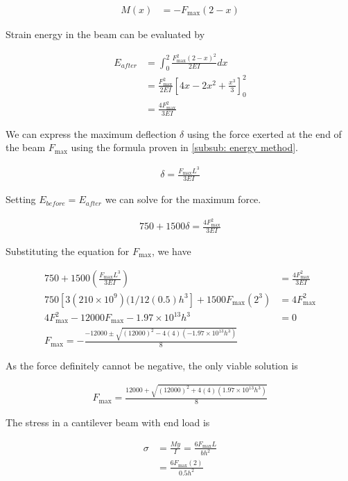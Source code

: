 \documentclass[
10pt,
a4paper,
openany,
svgnames,
]{book}
\begin{document}
\begin{evensolution}
  \begin{align*}
    M(x) &= -F_{\max}(2 - x)
  \end{align*}

  Strain energy in the beam can be evaluated by

  \begin{align*}
    E_{after} &= \int_0^2 \frac{F_{\max}^2(2-x)^2}{2EI} dx \\
              &= \frac{F_{\max}^2}{2EI} \left[ 4x - 2x^2 + \frac{x^3}{3} \right]_0^2 \\
              &=  \frac{4F_{\max}^2}{3EI}
  \end{align*}

  We can express the maximum deflection $\delta$ using the force exerted at the
  end of the beam $F_{\max}$ using the formula proven in \ref{subsub: energy
    method}.

  \begin{align*}
    \delta = \frac{F_{\max}L^3}{3EI}
  \end{align*}

  Setting $E_{before} = E_{after}$ we can solve for the maximum force.

  \begin{align*}
    750 + 1500\delta = \frac{4F_{\max}^2}{3EI}
  \end{align*}

  Substituting the equation for $F_{\max}$, we have

  \begin{align*}
    750 + 1500 \left( \frac{ F_{\max}L^3 }{3EI} \right) &= \frac{ 4F_{\max}^2 }{3EI} \\
    750 \left[ 3 (210 \times 10^9)(1/12 (0.5)h^3 \right] + 1500 F_{\max} \left( 2^3 \right) &= 4 F_{\max}^2 \\
    4F_{\max}^2 - 12000F_{\max} - 1.97 \times 10^{13}h^3 &= 0 \\
    F_{\max} = - \frac{-12000 \pm \sqrt{ (12000)^2 - 4(4)(-1.97 \times 10^{13}h^3)}}{8}
  \end{align*}

  As the force definitely cannot be negative, the only viable solution is

  \begin{align*}
    F_{\max} = \frac{12000 + \sqrt{ (12000)^2 + 4(4)(1.97 \times 10^{13}h^3)}}{8}
  \end{align*}

  The stress in a cantilever beam with end load is

  \begin{align*}
    \sigma &= \frac{My}{I} = \frac{6F_{\max}L}{bh^2} \\
           &= \frac{6F_{\max}(2)}{0.5h^2}
  \end{align*}


\end{evensolution}
\end{document}
